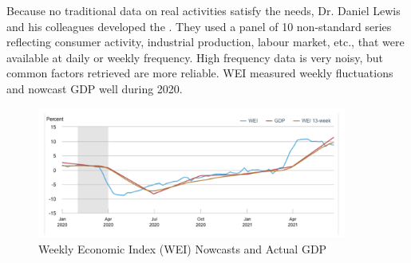         Because no traditional data on real activities satisfy the needs, Dr. Daniel Lewis and his colleagues developed the . They used a panel of 10 non-standard series reflecting consumer activity, industrial production, labour market, etc., that were available at daily or weekly frequency. High frequency data is very noisy, but common factors retrieved are more reliable. WEI measured weekly fluctuations and nowcast GDP well during 2020.

        \begin{figure}[H]
            \centering
            \includegraphics[width=4in]{images/ch7/weekly eco index.png}
            \caption{Weekly Economic Index (WEI) Nowcasts and Actual GDP}
        \end{figure}
        